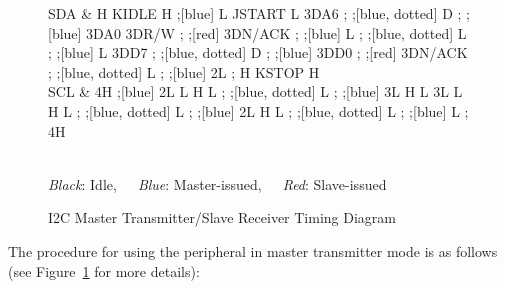 \begin{figure}[h]
	\centering
	\begin{tikztimingtable}[timing/font=\rmfamily, timing/d/text/.append style={font=\rmfamily}, xscale=1.5, yscale=2, timing/slope=0.2, timing/dslope=0.2, timing/d/background/.style={fill=white},
		timing/metachar={{K}[2]{#1H !{++(-.5\xunit + 0.5*\slope\xunit, -.5\yunit)} N[rectangle,scale=.6]{#2} !{++(.5\xunit - 0.5*\slope\xunit, +.5\yunit)}}},
		timing/metachar={{J}[2]{#1L !{++(-.5\xunit + 0.5*\slope\xunit, +.5\yunit)} N[rectangle,scale=.6]{#2} !{++(.5\xunit - 0.5*\slope\xunit, -.5\yunit)}}},]
		SDA & H K{IDLE} H ;[blue] L J{START} L 3D{A6} ; ;[blue, dotted] D{} ; ;[blue] 3D{A0} 3D{R/W} ; ;[red] 3D{N/ACK} ; ;[blue] L ;    ;[blue, dotted] L ; ;[blue] L 3D{D7} ; ;[blue, dotted] D{} ; ;[blue] 3D{D0} ; ;[red] 3D{N/ACK} ; ;[blue, dotted] L ; ;[blue] 2L ; H K{STOP} H \\
		SCL & 4H ;[blue] 2L L H L ; ;[blue, dotted] L ; ;[blue] 3{L H L} 3L    L H L ; ;[blue, dotted] L ; ;[blue] 2{L H L} ; ;[blue, dotted] L ; ;[blue] L ; 4H \\
		\begin{extracode}
		\end{extracode}
	\end{tikztimingtable}
	\\
	\textit{Black}: Idle,~~~{\color{blue}\textit{Blue}: Master-issued},~~~{\color{red}\textit{Red}: Slave-issued}
	\caption{I2C Master Transmitter/Slave Receiver Timing Diagram}
	\label{fig:i2c-master-transmitter}
\end{figure}

The procedure for using the  peripheral in master transmitter mode is as follows (see Figure~\ref{fig:i2c-master-transmitter} for more details):

